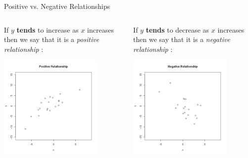 \begin{frame}{Positive vs. Negative Relationships}

  \begin{columns}

    \begin{definition}
      If $y$ \textbf{\color{red}tends} to increase as $x$ increases then we say
      that it is a \textit{\color{blue}positive relationship} : \\
      \centerline{\includegraphics[width=5cm]{img/positiveRelationship}}
    \end{definition}


    \begin{definition}
      If $y$ \textbf{\color{red}tends} to decrease as $x$ increases then we say
      that it is a \textit{\color{blue}negative relationship} : \\
      \centerline{\includegraphics[width=5cm]{img/negativeRelationship}}
    \end{definition}

  \end{columns}
  
\end{frame}


